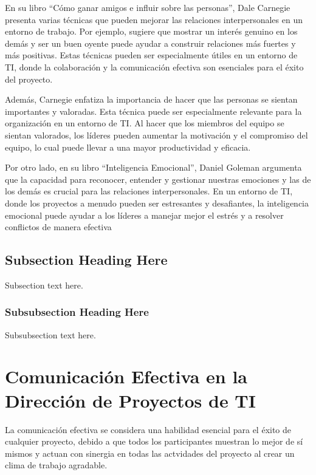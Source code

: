 \documentclass[journal]{IEEEtran}
\begin{document}
En su libro “Cómo ganar amigos e influir sobre las personas”, Dale Carnegie presenta varias técnicas que pueden mejorar las relaciones interpersonales en un entorno de trabajo. Por ejemplo, sugiere que mostrar un interés genuino en los demás y ser un buen oyente puede ayudar a construir relaciones más fuertes y más positivas. Estas técnicas pueden ser especialmente útiles en un entorno de TI, donde la colaboración y la comunicación efectiva son esenciales para el éxito del proyecto.

Además, Carnegie enfatiza la importancia de hacer que las personas se sientan importantes y valoradas. Esta técnica puede ser especialmente relevante para la organización en un entorno de TI. Al hacer que los miembros del equipo se sientan valorados, los líderes pueden aumentar la motivación y el compromiso del equipo, lo cual puede llevar a una mayor productividad y eficacia.

Por otro lado, en su libro “Inteligencia Emocional”, Daniel Goleman argumenta que la capacidad para reconocer, entender y gestionar nuestras emociones y las de los demás es crucial para las relaciones interpersonales. En un entorno de TI, donde los proyectos a menudo pueden ser estresantes y desafiantes, la inteligencia emocional puede ayudar a los líderes a manejar mejor el estrés y a resolver conflictos de manera efectiva

\subsection{Subsection Heading Here}
Subsection text here.

\subsubsection{Subsubsection Heading Here}
Subsubsection text here.




\section{Comunicación Efectiva en la Dirección de Proyectos de TI}
La comunicación efectiva se considera una habilidad esencial para el éxito de cualquier proyecto, debido a que todos los participantes muestran lo mejor de sí mismos y actuan con sinergia en todas las actvidades del proyecto al crear un clima de trabajo agradable. 
\end{document}
